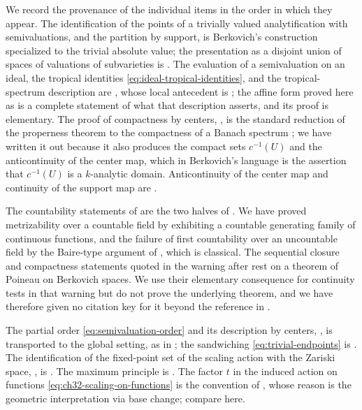 We record the provenance of the individual items in the order in which they
appear.  The identification of the points of a trivially valued
analytification with semivaluations, and the partition by support, is
Berkovich's construction \cite{Berk12} specialized to the trivial absolute
value; the presentation as a disjoint union of spaces of valuations of
subvarieties is \cite[\S1.1.2]{BJ22}.  The evaluation of a semivaluation on
an ideal, the tropical identities \eqref{eq:ideal-tropical-identities}, and
the tropical-spectrum description are \cite[\S1.1.3]{BJ22}, whose local
antecedent is \cite[\S1.2]{JM12}; the affine form proved here as
 is a complete statement of what that
description asserts, and its proof is elementary.  The proof of compactness
by centers, , is the standard reduction of the
properness theorem to the compactness of a Banach spectrum
\cite[Theorem~1.2.1]{Berk12}; we have written it out because it also produces
the compact sets $c^{-1}(U)$ and the anticontinuity of the center map,
which in Berkovich's language is the assertion that $c^{-1}(U)$ is a
$k$-analytic domain.  Anticontinuity of the center map and continuity of
the support map are \cite[\S1.1.3]{BJ22}.

The countability statements of  are the two
halves of \cite[Remark~1.1]{BJ22}.  We have proved metrizability over a
countable field by exhibiting a countable generating family of continuous
functions, and the failure of first countability over an uncountable field by
the Baire-type argument of , which is
classical.  The sequential closure and compactness statements quoted in the warning
after  rest on a theorem of Poineau on
Berkovich spaces.  We use their elementary consequence for continuity
tests in that warning but do not prove the underlying theorem, and we have therefore given no
citation key for it beyond the reference in \cite[Remark~1.1]{BJ22}.

The partial order \eqref{eq:semivaluation-order} and its description by
centers, , is \cite[Lemma~4.4]{JM12}
transported to the global setting, as in \cite[\S1.1.4]{BJ22}; the
sandwiching \eqref{eq:trivial-endpoints} is \cite[Example~1.2]{BJ22}.  The
identification of the fixed-point set of the scaling action with the Zariski
space, , is \cite[\S1.1.5]{BJ22}.  The maximum
principle  is \cite[Lemma~1.4]{BJ22}.  The
factor $t$ in the induced action on functions
\eqref{eq:ch32-scaling-on-functions} is the convention of
\cite[(1.3)]{BJ22}, whose reason is the geometric interpretation via base
change; compare  here.

